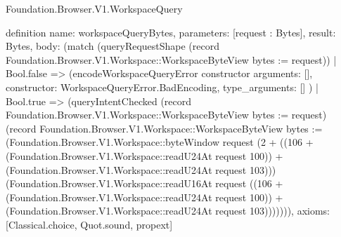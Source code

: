 \begin{lexlean}{Foundation.Browser.V1.WorkspaceQuery}
\begin{semanticmodule}
definition{
  name: workspaceQueryBytes,
  parameters: [request : Bytes],
  result: Bytes,
  body: (match (queryRequestShape (record Foundation.Browser.V1.Workspace::WorkspaceByteView {bytes := request}))
    | Bool.false => (encodeWorkspaceQueryError constructor{
      arguments: [],
      constructor: WorkspaceQueryError.BadEncoding,
      type_arguments: []
    })
    | Bool.true => (queryIntentChecked (record Foundation.Browser.V1.Workspace::WorkspaceByteView {bytes := request}) (record Foundation.Browser.V1.Workspace::WorkspaceByteView {bytes := (Foundation.Browser.V1.Workspace::byteWindow request (2 + ((106 + (Foundation.Browser.V1.Workspace::readU24At request 100)) + (Foundation.Browser.V1.Workspace::readU24At request 103))) (Foundation.Browser.V1.Workspace::readU16At request ((106 + (Foundation.Browser.V1.Workspace::readU24At request 100)) + (Foundation.Browser.V1.Workspace::readU24At request 103))))}))),
  axioms: [Classical.choice, Quot.sound, propext]
}
\end{semanticmodule}
\end{lexlean}
